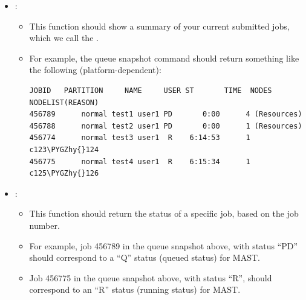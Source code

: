 \documentclass[letterpaper,10pt,english]{sphinxmanual}
\def\PYGZus{\char`\_}
\def\PYGZdl{\char`\$}
\def\PYGZhy{\char`\-}
\begin{document}
\begin{itemize}
\begin{itemize}
\item {} 
On a different cluster, it would return  as the jobid for the following submission and resulting screen text:

\begin{Verbatim}[commandchars=\\\{\}]
[user1@mycluster test\PYGZus{}job]\PYGZdl{} qsub submit.sh
456789.mycluster.abcd.univ.edu
\end{Verbatim}

\end{itemize}

\item {} 
:
\begin{itemize}
\item {} 
This function should show a summary of your current submitted jobs, which we call the .

\item {} 
For example, the queue snapshot command should return something like the following (platform-dependent):

\begin{Verbatim}[commandchars=\\\{\}]
JOBID   PARTITION     NAME     USER ST       TIME  NODES NODELIST(REASON)
456789      normal test1 user1 PD       0:00      4 (Resources)
456788      normal test2 user1 PD       0:00      1 (Resources)
456774      normal test3 user1  R    6:14:53      1 c123\PYGZhy{}124
456775      normal test4 user1  R    6:15:34      1 c125\PYGZhy{}126
\end{Verbatim}

\end{itemize}

\item {} 
:
\begin{itemize}
\item {} 
This function should return the status of a specific job, based on the job number.

\item {} 
For example, job 456789 in the queue snapshot above, with status ``PD'' should correspond to a ``Q'' status (queued status) for MAST.

\item {} 
Job 456775 in the queue snapshot above, with status ``R'', should correspond to an ``R'' status (running status) for MAST.

\end{itemize}


\end{itemize}
\end{document}
